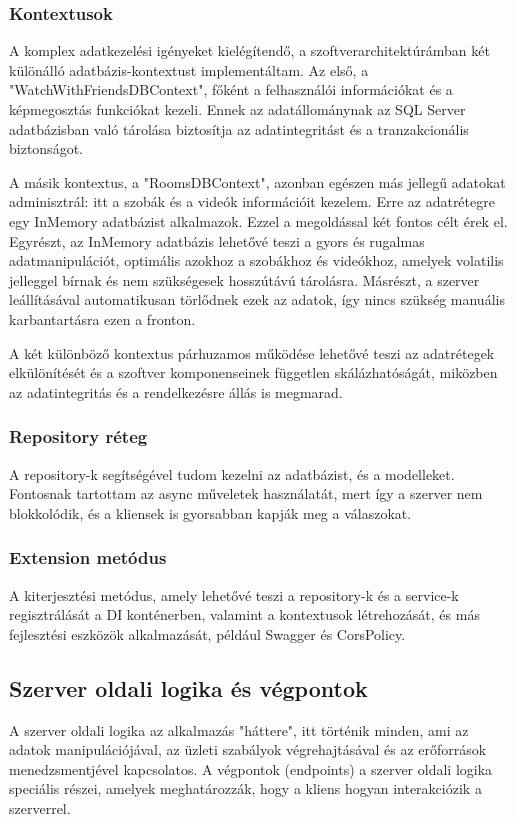 \subsubsection{Kontextusok}
A komplex adatkezelési igényeket kielégítendő, a szoftverarchitektúrámban két különálló adatbázis-kontextust implementáltam. Az első, a "WatchWithFriendsDBContext", főként a felhasználói információkat és a képmegosztás funkciókat kezeli. Ennek az adatállománynak az SQL Server adatbázisban való tárolása biztosítja az adatintegritást és a tranzakcionális biztonságot.

A másik kontextus, a "RoomsDBContext", azonban egészen más jellegű adatokat adminisztrál: itt a szobák és a videók információit kezelem. Erre az adatrétegre egy InMemory adatbázist alkalmazok. Ezzel a megoldással két fontos célt érek el. Egyrészt, az InMemory adatbázis lehetővé teszi a gyors és rugalmas adatmanipulációt, optimális azokhoz a szobákhoz és videókhoz, amelyek volatilis jelleggel bírnak és nem szükségesek hosszútávú tárolásra. Másrészt, a szerver leállításával automatikusan törlődnek ezek az adatok, így nincs szükség manuális karbantartásra ezen a fronton.

A két különböző kontextus párhuzamos működése lehetővé teszi az adatrétegek elkülönítését és a szoftver komponenseinek független skálázhatóságát, miközben az adatintegritás és a rendelkezésre állás is megmarad.
\subsubsection{Repository réteg}
A repository-k segítségével tudom kezelni az adatbázist, és a modelleket.
Fontosnak tartottam az async műveletek használatát, mert így a szerver nem blokkolódik, és a kliensek is gyorsabban kapják meg a válaszokat.
\subsubsection{Extension metódus}
A kiterjesztési metódus, amely lehetővé teszi a repository-k és a service-k regisztrálását a DI konténerben, valamint a kontextusok létrehozását, és más fejlesztési eszközök alkalmazását, például Swagger és CorsPolicy.
\vspace{1em}
\subsection{Szerver oldali logika és végpontok}
A szerver oldali logika az alkalmazás "háttere", itt történik minden, ami az adatok manipulációjával, az üzleti szabályok végrehajtásával és az erőforrások menedzsmentjével kapcsolatos. A végpontok (endpoints) a szerver oldali logika speciális részei, amelyek meghatározzák, hogy a kliens hogyan interakciózik a szerverrel.
